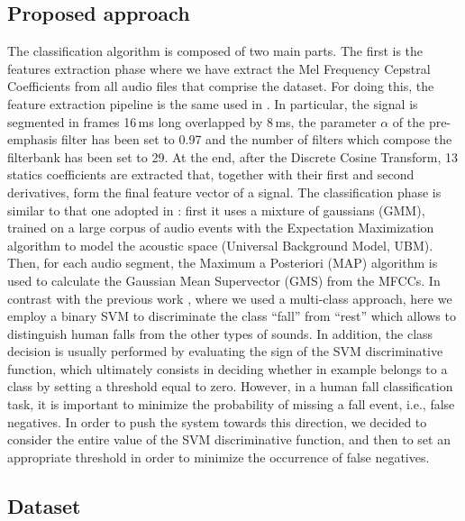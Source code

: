 \subsection{Proposed approach}
The classification algorithm is composed of two main parts.
The first is the features extraction phase where we have extract the Mel Frequency Cepstral Coefficients from all audio files that comprise the dataset. For doing this, the feature extraction pipeline is the same used in . In particular, the signal is segmented in frames 16\,ms long overlapped by 8\,ms, the parameter $\alpha$ of the pre-emphasis filter has been set to 0.97 and the number of filters which compose the filterbank has been set to 29. At the end, after the Discrete Cosine Transform, 13 statics coefficients are extracted that, together with their first and second derivatives, form the final feature vector of a signal.
The classification phase is similar to that one adopted in : first it uses a mixture of gaussians (GMM), trained on a large corpus of audio events with the Expectation Maximization algorithm to model the acoustic space (Universal Background Model, UBM). Then, for each audio segment, the Maximum a Posteriori (MAP) algorithm is used to calculate the Gaussian Mean Supervector (GMS) from the MFCCs. %
In contrast with the previous work , where we used a multi-class approach, here we employ a binary SVM to discriminate the class ``fall'' from ``rest'' which allows to distinguish human falls from the other types of sounds. In addition, the class decision is usually performed by evaluating the sign of the SVM discriminative function, which ultimately consists in deciding whether in example belongs to a class by setting a threshold equal to zero. However, in a human fall classification task, it is important to minimize the probability of missing a fall event, i.e., false negatives. In order to push the system towards this direction, we decided to consider the entire value of the SVM discriminative function, and then to set an appropriate threshold in order to minimize the occurrence of false negatives.

\subsection{Dataset}\label{sec:data_binary_svm}

